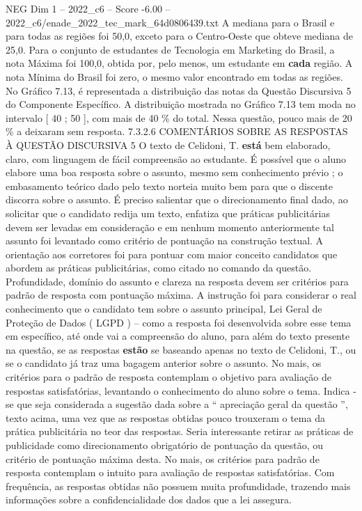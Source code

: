 \begin{textsample}{NEG Dim 1 – 2022\_c6 – Score -6.00 – 2022\_c6/enade\_2022\_tec\_mark\_64d0806439.txt}
A mediana para o Brasil e para todas as regiões foi 50,0, exceto para o Centro-Oeste que obteve mediana de 25,0.
Para o conjunto de estudantes de Tecnologia em Marketing do Brasil, a nota Máxima foi 100,0, obtida por, pelo menos, um estudante em \textbf{cada} região.
A nota Mínima do Brasil foi zero, o mesmo valor encontrado em todas as regiões.
No Gráfico 7.13, é representada a distribuição das notas da Questão Discursiva 5 do Componente Específico.
A distribuição mostrada no Gráfico 7.13 tem moda no intervalo [ 40 ; 50 ], com mais de 40 \% do total.
Nessa questão, pouco mais de 20 \% a deixaram sem resposta. 7.3.2.6 COMENTÁRIOS SOBRE AS RESPOSTAS À QUESTÃO DISCURSIVA 5 O texto de Celidoni, T. \textbf{está} bem elaborado, claro, com linguagem de fácil compreensão ao estudante.
É possível que o aluno elabore uma boa resposta sobre o assunto, mesmo sem conhecimento prévio ; o embasamento teórico dado pelo texto norteia muito bem para que o discente discorra sobre o assunto.
É preciso salientar que o direcionamento final dado, ao solicitar que o candidato redija um texto, enfatiza que práticas publicitárias devem ser levadas em consideração e em nenhum momento anteriormente tal assunto foi levantado como critério de pontuação na construção textual.
A orientação aos corretores foi para pontuar com maior conceito candidatos que abordem as práticas publicitárias, como citado no comando da questão.
Profundidade, domínio do assunto e clareza na resposta devem ser critérios para padrão de resposta com pontuação máxima.
A instrução foi para considerar o real conhecimento que o candidato tem sobre o assunto principal, Lei Geral de Proteção de Dados ( LGPD ) – como a resposta foi desenvolvida sobre esse tema em específico, até onde vai a compreensão do aluno, para além do texto presente na questão, se as respostas \textbf{estão} se baseando apenas no texto de Celidoni, T., ou se o candidato já traz uma bagagem anterior sobre o assunto.
No mais, os critérios para o padrão de resposta contemplam o objetivo para avaliação de respostas satisfatórias, levantando o conhecimento do aluno sobre o tema.
Indica -se que seja considerada a sugestão dada sobre a “ apreciação geral da questão ”, texto acima, uma vez que as respostas obtidas pouco trouxeram o tema da prática publicitária no teor das respostas.
Seria interessante retirar as práticas de publicidade como direcionamento obrigatório de pontuação da questão, ou critério de pontuação máxima desta.
No mais, os critérios para padrão de resposta contemplam o intuito para avaliação de respostas satisfatórias.
Com frequência, as respostas obtidas não possuem muita profundidade, trazendo mais informações sobre a confidencialidade dos dados que a lei assegura.

\end{textsample}
